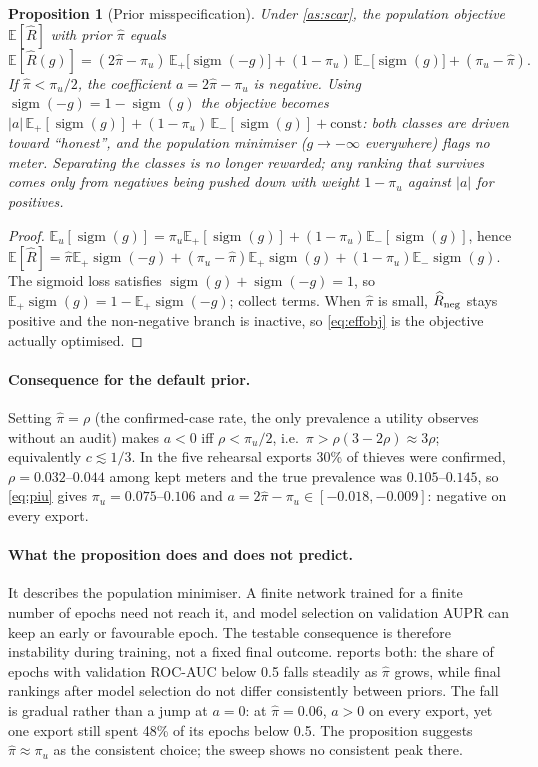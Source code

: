 \documentclass[11pt,a4paper]{article}
\theoremstyle{plain}
\newtheorem{proposition}{Proposition}
\theoremstyle{definition}
\theoremstyle{remark}
\newcommand{\E}{\mathbb{E}}
\newcommand{\sig}{\operatorname{sigm}}
\begin{document}
\begin{proposition}[Prior misspecification]
\label{prop:prior}
Under \cref{as:scar}, the population objective $\E[\widehat R]$ with prior $\hat\pi$ equals
\begin{equation}
\E[\widehat R(g)]=(2\hat\pi-\pi_u)\,\E_+\big[\sig(-g)\big]+(1-\pi_u)\,\E_-\big[\sig(g)\big]+(\pi_u-\hat\pi).
\label{eq:effobj}
\end{equation}
If $\hat\pi<\pi_u/2$, the coefficient $a=2\hat\pi-\pi_u$ is negative. Using $\sig(-g)=1-\sig(g)$ the objective becomes $|a|\,\E_+[\sig(g)]+(1-\pi_u)\,\E_-[\sig(g)]+\text{const}$: both classes are driven toward ``honest'', and the population minimiser ($g\to-\infty$ everywhere) flags no meter. Separating the classes is no longer rewarded; any ranking that survives comes only from negatives being pushed down with weight $1-\pi_u$ against $|a|$ for positives.
\end{proposition}
\begin{proof}
$\E_u[\sig(g)]=\pi_u\E_+[\sig(g)]+(1-\pi_u)\E_-[\sig(g)]$, hence $\E[\widehat R]=\hat\pi\E_+\sig(-g)+(\pi_u-\hat\pi)\E_+\sig(g)+(1-\pi_u)\E_-\sig(g)$. The sigmoid loss satisfies $\sig(g)+\sig(-g)=1$, so $\E_+\sig(g)=1-\E_+\sig(-g)$; collect terms. When $\hat\pi$ is small, $\widehat R_{\rm neg}$ stays positive and the non-negative branch is inactive, so \eqref{eq:effobj} is the objective actually optimised.
\end{proof}

\paragraph{Consequence for the default prior.} Setting $\hat\pi=\rho$ (the confirmed-case rate, the only prevalence a utility observes without an audit) makes $a<0$ iff $\rho<\pi_u/2$, i.e.\ $\pi>\rho(3-2\rho)\approx3\rho$; equivalently $c\lesssim 1/3$. In the five rehearsal exports 30\% of thieves were confirmed, $\rho=0.032$--$0.044$ among kept meters and the true prevalence was $0.105$--$0.145$, so \eqref{eq:piu} gives $\pi_u=0.075$--$0.106$ and $a=2\hat\pi-\pi_u\in[-0.018,-0.009]$: negative on every export.

\paragraph{What the proposition does and does not predict.} It describes the population minimiser. A finite network trained for a finite number of epochs need not reach it, and model selection on validation AUPR can keep an early or favourable epoch. The testable consequence is therefore instability during training, not a fixed final outcome.  reports both: the share of epochs with validation ROC-AUC below 0.5 falls steadily as $\hat\pi$ grows, while final rankings after model selection do not differ consistently between priors. The fall is gradual rather than a jump at $a=0$: at $\hat\pi=0.06$, $a>0$ on every export, yet one export still spent 48\% of its epochs below 0.5. The proposition suggests $\hat\pi\approx\pi_u$ as the consistent choice; the sweep shows no consistent peak there.
\end{document}
